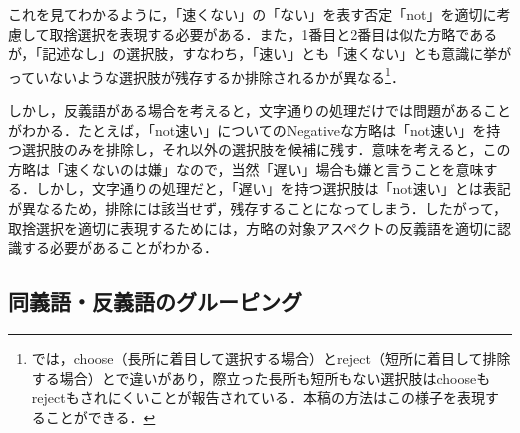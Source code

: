 \documentclass[japanese]{jnlp_1.3a}
\begin{document}
これを見てわかるように，「速くない」の「ない」を表す否定「not」を適切に考慮して取捨選択を表現する必要がある．また，1番目と2番目は似た方略であるが，「記述なし」の選択肢，すなわち，「速い」とも「速くない」とも意識に挙がっていないような選択肢が残存するか排除されるかが異なる\footnote{では，choose（長所に着目して選択する場合）とreject（短所に着目して排除する場合）とで違いがあり，際立った長所も短所もない選択肢はchooseもrejectもされにくいことが報告されている．本稿の方法はこの様子を表現することができる．}．

しかし，反義語がある場合を考えると，文字通りの処理だけでは問題があることがわかる．たとえば，「not速い」についてのNegativeな方略は「not速い」を持つ選択肢のみを排除し，それ以外の選択肢を候補に残す．意味を考えると，この方略は「速くないのは嫌」なので，当然「遅い」場合も嫌と言うことを意味する．しかし，文字通りの処理だと，「遅い」を持つ選択肢は「not速い」とは表記が異なるため，排除には該当せず，残存することになってしまう．したがって，取捨選択を適切に表現するためには，方略の対象アスペクトの反義語を適切に認識する必要があることがわかる．

\subsection{同義語・反義語のグルーピング}
\label{sec:grouping}
\end{document}
